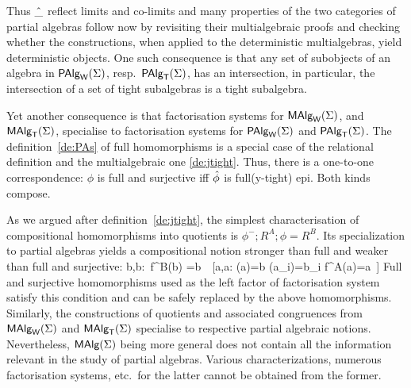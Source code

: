 \documentclass[10pt]{article}
\begin{document}
\noindent
Thus $\hat{\_}$ reflect limits and co-limits and many properties of the
two categories of partial algebras follow now by revisiting their
multialgebraic proofs and checking whether the constructions, when
applied to the deterministic multialgebras, yield deterministic
objects.  One such consequence is that any set of subobjects of an
algebra in $\mbox{\rm\sf PAlg}_{\sf W}(\Sigma)$, resp.\ $\mbox{\rm\sf PAlg}_{\sf T}(\Sigma)$, has an intersection, in particular,
the intersection of a set of tight subalgebras is a tight subalgebra.


Yet another consequence is that factorisation systems for $\mbox{\rm\sf MAlg}_{\sf W}(\Sigma)$, and
$\mbox{\rm\sf MAlg}_{\sf T}(\Sigma)$, specialise to factorisation systems for $\mbox{\rm\sf PAlg}_{\sf W}(\Sigma)$ and $\mbox{\rm\sf PAlg}_{\sf T}(\Sigma)$.
The definition~\ref{de:PAs} of full homomorphisms is a special case of
the relational definition and the multialgebraic one \ref{de:jtight}. 
Thus, there is a one-to-one correspondence:
$\phi$ is full and surjective iff $\hat{\phi}$ is full(y-tight) epi.  
Both kinds compose.

As we argued after definition~\ref{de:jtight}, the simplest
characterisation of compositional homomorphisms into quotients is
$\phi^-;R^A;\phi=R^B$.  Its specialization to partial algebras yields
a compositional notion stronger than full and weaker than full and surjective:
\eq 
{ \forall \lis b,b:\ f^B(\lis b) =b\ \Iff\ [\exists \lis a,a:
\phi(a)=b \land \phi(a_i)=b_i \land f^A(\lis a)=a\ ]
\label{eq:ftsPA}
} 
Full and surjective homomorphisms used as the left factor of
factorisation system satisfy this condition and can be safely replaced
by the above homomorphisms.  Similarly, the constructions of quotients
and associated congruences from $\mbox{\rm\sf MAlg}_{\sf W}(\Sigma)$ and $\mbox{\rm\sf MAlg}_{\sf T}(\Sigma)$ specialise to
respective partial algebraic notions.  Nevertheless, $\mbox{\rm\sf MAlg}(\Sigma)$ being more
general does not contain all the information relevant in the study of
partial algebras. Various characterizations, numerous factorisation
systems, etc.\ for the latter cannot be obtained from the former.
\end{document}

